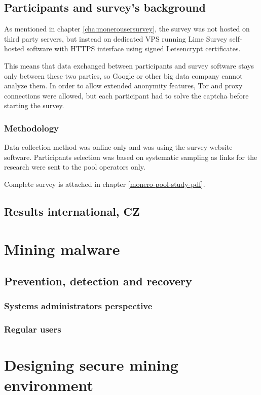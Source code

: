 \documentclass[
  printed, %
  table,   %
  nolof,     %
  nolot,     %
           oneside, color
]{fithesis3}
\begin{document}
\section{Participants and survey's background}
As mentioned in chapter \ref{cha:monerousersurvey}, the survey was not hosted on third party servers, but instead on dedicated VPS running Lime Survey self-hosted software with HTTPS interface using signed Letsencrypt certificates.

This means that data exchanged between participants and survey software stays only between these two parties, so Google or other big data company cannot analyze them. In order to allow extended anonymity features, Tor and proxy connections were allowed, but each participant had to solve the captcha before starting the survey.
\subsection{Methodology}
Data collection method was online only and was using the survey website software. Participants selection was based on systematic sampling as links for the research were sent to the pool operators only.

Complete survey is attached in chapter \ref{monero-pool-study-pdf}.
\section{Results international, CZ}

 
\chapter{Mining malware}
\section{Prevention, detection and recovery}
\subsection{Systems administrators perspective}
\subsection{Regular users}


\chapter{Designing secure mining environment}
\end{document}

